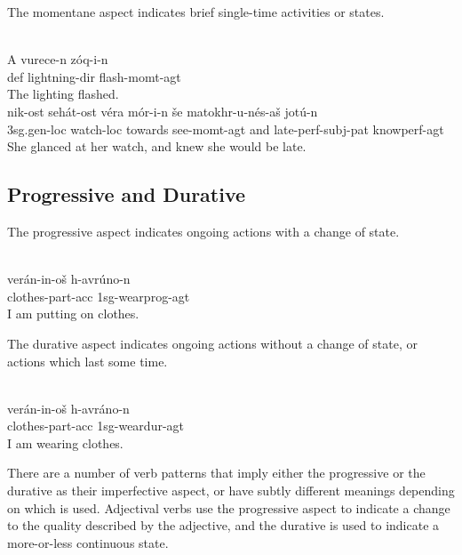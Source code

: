 \documentclass[grammar]{subfiles}
\begin{document}
The momentane aspect indicates brief single-time activities or states.   

\begin{exe}
  \ex {}\\
  \gll A vurece-n zóq-i-n\\
  \acs{def} lightning-\acs{dir} flash-\acs{momt}-\acs{agt}\\
  \glt The lighting flashed. %
  \ex {}\\
  \gll nik-ost sehát-ost véra mór-i-n še matokhr-u-nés-aš jotú-n\\ 
  \acs{3sg}.\acs{gen}-\acs{loc} watch-\acs{loc} towards see-\acs{momt}-\acs{agt} and late-\acs{perf}-\acs{subj}-\acs{pat} know\bs\acs{perf}-\acs{agt}\\
  \glt She glanced at her watch, and knew she would be late.
\end{exe}


\subsection{Progressive and Durative}
\label{vp:ssec_progressive_durative}

The progressive aspect indicates ongoing actions with a change of state.  

\begin{exe}
  \ex\label{ex:vm_putting_on_clothes} \\
  \gll verán-in-oš h-avrúno-n\\
  clothes-\acs{part}-\acs{acc} \acs{1sg}-wear\bs\acs{prog}-\acs{agt}\\
  \glt I am putting on clothes.
\end{exe}

The durative aspect indicates ongoing actions without a change of state, or
actions which last some time.

\begin{exe}
  \ex\label{ex:vm_wearing_clothes} \\
  \gll verán-in-oš h-avráno-n\\
  clothes-\acs{part}-\acs{acc} \acs{1sg}-wear\bs\acs{dur}-\acs{agt}\\
  \glt I am wearing clothes.
\end{exe}

There are a number of verb patterns that imply either the progressive or the
durative as their imperfective aspect, or have subtly different meanings
depending on which is used.  Adjectival verbs use the progressive aspect to
indicate a change to the quality described by the adjective, and the durative
is used to indicate a more-or-less continuous state. 
\end{document}
